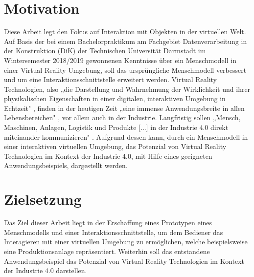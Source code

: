 \section{Motivation}\label{sec:Motivation}
Diese Arbeit legt den Fokus auf Interaktion mit Objekten in der virtuellen Welt. Auf Basis der bei einem Bachelorpraktikum am Fachgebiet Datenverarbeitung in der Konstruktion (DiK) der Technischen Universität Darmstadt im Wintersemester 2018/2019 gewonnenen Kenntnisse über ein Menschmodell in einer Virtual Reality Umgebung, soll das ursprüngliche Menschmodell verbessert und um eine Interaktionsschnittstelle erweitert werden.
\newline
Virtual Reality Technologien, also „die Darstellung und Wahrnehmung der Wirklichkeit und ihrer physikalischen Eigenschaften in einer digitalen, interaktiven Umgebung in Echtzeit" \cite[S.1]{4}, finden in der heutigen Zeit „eine immense Anwendungsbreite in allen Lebensbereichen" \cite[S.1]{4}, vor allem auch in der Industrie. Langfristig sollen „Mensch, Maschinen, Anlagen, Logistik und Produkte [...] in der Industrie 4.0 direkt miteinander kommunizieren" \cite[S.2]{4}.
\newline
Aufgrund dessen kann, durch ein Menschmodell in einer interaktiven virtuellen Umgebung, das Potenzial von Virtual Reality Technologien im Kontext der Industrie 4.0, mit Hilfe eines geeigneten Anwendungsbeispiels, dargestellt werden.

\section{Zielsetzung}\label{sec:Zielsetzung}
Das Ziel dieser Arbeit liegt in der Erschaffung eines Prototypen eines Menschmodells und einer Interaktionsschnittstelle, um dem Bediener das Interagieren mit einer virtuellen Umgebung zu ermöglichen, welche beispielsweise eine Produktionsanlage repräsentiert. Weiterhin soll das entstandene Anwendungsbeispiel das Potenzial von Virtual Reality Technologien im Kontext der Industrie 4.0 darstellen.
\newpage

